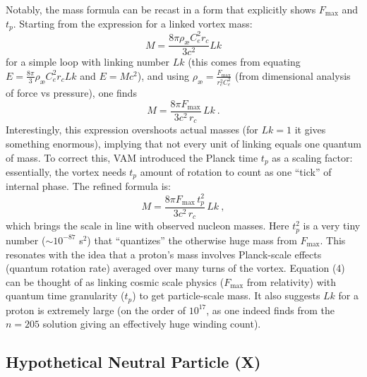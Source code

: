 \documentclass[a4paper,12pt]{article}
\begin{document}
        Notably, the mass formula can be recast in a form that explicitly shows $F_{\max}$ and $t_p$. Starting from the expression for a linked vortex mass:
        \begin{equation}
        M = \frac{8\pi \rho_{\text{\ae}} C_e^2 r_c}{3c^2} Lk
        \end{equation}
        for a simple loop with linking number $Lk$ (this comes from equating $E=\frac{8\pi}{3}\rho_{\text{\ae}}C_e^2 r_c Lk$ and $E=Mc^2$), and using $\rho_{\text{\ae}} = \frac{F_{\max}}{r_c^2 C_e^2}$ (from dimensional analysis of force vs pressure), one finds
        \begin{equation}
        M = \frac{8\pi F_{\max}}{3 c^2\,r_c}\,Lk~.
        \end{equation}
        Interestingly, this expression overshoots actual masses (for $Lk=1$ it gives something enormous), implying that not every unit of linking equals one quantum of mass. To correct this, VAM introduced the Planck time $t_p$ as a scaling factor: essentially, the vortex needs $t_p$ amount of rotation to count as one ``tick'' of internal phase. The refined formula is:
        \begin{equation}
        M = \frac{8\pi F_{\max}\,t_p^2}{3 c^2\,r_c}\,Lk~,
        \end{equation}
        which brings the scale in line with observed nucleon masses. Here $t_p^2$ is a very tiny number ($\sim10^{-87}$ s$^2$) that ``quantizes'' the otherwise huge mass from $F_{\max}$. This resonates with the idea that a proton's mass involves Planck-scale effects (quantum rotation rate) averaged over many turns of the vortex. Equation (4) can be thought of as linking cosmic scale physics ($F_{\max}$ from relativity) with quantum time granularity ($t_p$) to get particle-scale mass. It also suggests $Lk$ for a proton is extremely large (on the order of $10^{17}$, as one indeed finds from the $n=205$ solution giving an effectively huge winding count).
        
        \subsection{Hypothetical Neutral Particle (X)}
        
\end{document}
